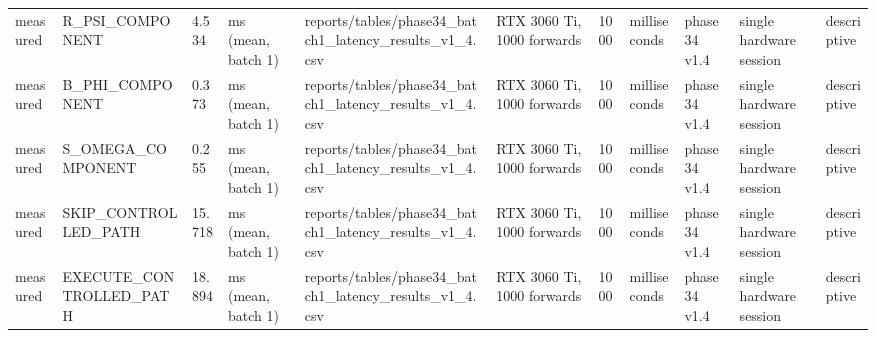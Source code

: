\begin{tabular}{lllllllllll}
measured & R\_PSI\_COMPONENT & 4.534 & ms (mean, batch 1) & reports/tables/phase34\_batch1\_latency\_results\_v1\_4.csv & RTX 3060 Ti, 1000 forwards & 1000 & milliseconds & phase34 v1.4 & single hardware session & descriptive \\
measured & B\_PHI\_COMPONENT & 0.373 & ms (mean, batch 1) & reports/tables/phase34\_batch1\_latency\_results\_v1\_4.csv & RTX 3060 Ti, 1000 forwards & 1000 & milliseconds & phase34 v1.4 & single hardware session & descriptive \\
measured & S\_OMEGA\_COMPONENT & 0.255 & ms (mean, batch 1) & reports/tables/phase34\_batch1\_latency\_results\_v1\_4.csv & RTX 3060 Ti, 1000 forwards & 1000 & milliseconds & phase34 v1.4 & single hardware session & descriptive \\
measured & SKIP\_CONTROLLED\_PATH & 15.718 & ms (mean, batch 1) & reports/tables/phase34\_batch1\_latency\_results\_v1\_4.csv & RTX 3060 Ti, 1000 forwards & 1000 & milliseconds & phase34 v1.4 & single hardware session & descriptive \\
measured & EXECUTE\_CONTROLLED\_PATH & 18.894 & ms (mean, batch 1) & reports/tables/phase34\_batch1\_latency\_results\_v1\_4.csv & RTX 3060 Ti, 1000 forwards & 1000 & milliseconds & phase34 v1.4 & single hardware session & descriptive \\
\hline
\end{tabular}
